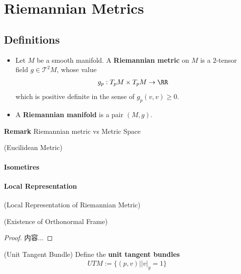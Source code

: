 \documentclass[Total.tex]{subfiles}
\begin{document}
	
	\chapter{Riemannian Metrics}
		\section{Definitions}
			\begin{Def}
				\begin{itemize}
					\item Let $M$ be a smooth manifold. A \textbf{Riemannian metric} on $M$ is a $2$-tensor field $g\in \mathcal{T}^2M$, whose value
					\begin{gather*}
						g_p:T_p M\times T_p M\rightarrow \RR
					\end{gather*}
					which is positive definite in the sense of $g_p(v,v)\geq 0$. 
					\item A \textbf{Riemannian manifold} is a pair $(M,g)$.
				\end{itemize}
			\end{Def}
			
			\textbf{Remark} Riemannian metric vs Metric Space
			
			\begin{example}
				(Eucilidean Metric) 
			\end{example}
			\subsubsection{Isometires}
			\subsubsection{Local Representation}
				\begin{Def}
					(Local Representation of Riemannian Metric)
				\end{Def}
				
				
				\begin{proposition}
					(Existence of Orthonormal Frame)
				\end{proposition}
				\begin{proof}
					内容...
				\end{proof}
				\begin{Def}
					(Unit Tangent Bundle)   Define the \textbf{unit tangent bundles}
					\begin{gather*}
						UTM:=\{(p,v)||v|_g=1\}
					\end{gather*}
				\end{Def}
				
\end{document}
